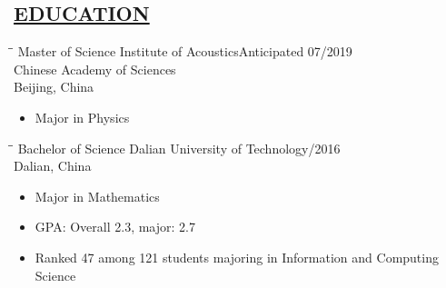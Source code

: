 \documentclass{res} %
\begin{document}

\address{Email: karel.wang@gmail.com, \ Phone: +86 18130056757 
\\
\\
Current Address: University of Chinese Academy of Sciences,\\ \qquad \qquad 
\qquad {} Huaibeizhuang, Huairou District,\\ \qquad \qquad 
\qquad \qquad Beijing, China}

\begin{resume}
\section{\underline{EDUCATION}}


\vspace{-0.02in}	
\begin{tabbing}
    \hspace{2.2in}\= \hspace{2.8in}\= \kill %
    Master of Science   \>Institute of Acoustics\>Anticipated 07/2019  \\
                        \> Chinese Academy of Sciences \>\\
                        \> Beijing, China\>\\
    \end{tabbing}\vspace{-22pt}      %
\vspace{+0.05in}
\begin{itemize}
  \item Major in Physics

\end{itemize}
\vspace{-0.1in}

\vspace{-0.02in}	
\begin{tabbing}
    \hspace{2.2in}\= \hspace{2.8in}\= \kill %
    Bachelor of Science   \>Dalian University of Technology/2016  \\
                        \> Dalian, China \>\\
    \end{tabbing}\vspace{-22pt}      %
\vspace{+0.05in}
\begin{itemize}
  \item Major in Mathematics
  \item GPA: Overall 2.3, major: 2.7
  \item Ranked 47 among 121 students majoring in  Information and Computing Science
\end{itemize}
\vspace{-0.1in}


\end{resume}
\end{document}

